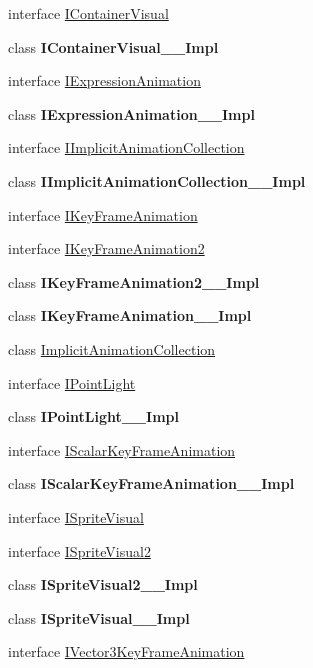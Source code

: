 \begin{DoxyCompactItemize}
interface \hyperlink{interface_windows_1_1_u_i_1_1_composition_1_1_i_container_visual}{I\+Container\+Visual}
\item 
class {\bfseries I\+Container\+Visual\+\_\+\+\_\+\+Impl}
\item 
interface \hyperlink{interface_windows_1_1_u_i_1_1_composition_1_1_i_expression_animation}{I\+Expression\+Animation}
\item 
class {\bfseries I\+Expression\+Animation\+\_\+\+\_\+\+Impl}
\item 
interface \hyperlink{interface_windows_1_1_u_i_1_1_composition_1_1_i_implicit_animation_collection}{I\+Implicit\+Animation\+Collection}
\item 
class {\bfseries I\+Implicit\+Animation\+Collection\+\_\+\+\_\+\+Impl}
\item 
interface \hyperlink{interface_windows_1_1_u_i_1_1_composition_1_1_i_key_frame_animation}{I\+Key\+Frame\+Animation}
\item 
interface \hyperlink{interface_windows_1_1_u_i_1_1_composition_1_1_i_key_frame_animation2}{I\+Key\+Frame\+Animation2}
\item 
class {\bfseries I\+Key\+Frame\+Animation2\+\_\+\+\_\+\+Impl}
\item 
class {\bfseries I\+Key\+Frame\+Animation\+\_\+\+\_\+\+Impl}
\item 
class \hyperlink{class_windows_1_1_u_i_1_1_composition_1_1_implicit_animation_collection}{Implicit\+Animation\+Collection}
\item 
interface \hyperlink{interface_windows_1_1_u_i_1_1_composition_1_1_i_point_light}{I\+Point\+Light}
\item 
class {\bfseries I\+Point\+Light\+\_\+\+\_\+\+Impl}
\item 
interface \hyperlink{interface_windows_1_1_u_i_1_1_composition_1_1_i_scalar_key_frame_animation}{I\+Scalar\+Key\+Frame\+Animation}
\item 
class {\bfseries I\+Scalar\+Key\+Frame\+Animation\+\_\+\+\_\+\+Impl}
\item 
interface \hyperlink{interface_windows_1_1_u_i_1_1_composition_1_1_i_sprite_visual}{I\+Sprite\+Visual}
\item 
interface \hyperlink{interface_windows_1_1_u_i_1_1_composition_1_1_i_sprite_visual2}{I\+Sprite\+Visual2}
\item 
class {\bfseries I\+Sprite\+Visual2\+\_\+\+\_\+\+Impl}
\item 
class {\bfseries I\+Sprite\+Visual\+\_\+\+\_\+\+Impl}
\item 
interface \hyperlink{interface_windows_1_1_u_i_1_1_composition_1_1_i_vector3_key_frame_animation}{I\+Vector3\+Key\+Frame\+Animation}

\end{DoxyCompactItemize}

